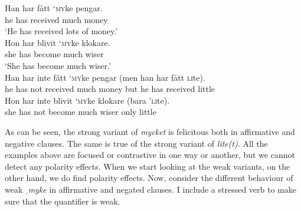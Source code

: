 \documentclass[output=paper]{langscibook}
\begin{document}
\ea
\gll Han    har    fått         ‘\textsc{my}ke   pengar.\\
he           has       received   much     money\\
\glt `He has received lots of money.’\\
\ex
\gll Hon  har   blivit     ‘\textsc{my}ke   klokare.\\
she         has    become  much    wiser\\
\glt `She has become much wiser.’\\
\ex
\gll Han  har     inte     fått       ‘\textsc{my}ke   pengar (men   han     har   fått \textsc{li}te).\\
he       has       not     received  much     money   but   he   has   received   little\\
\ex
\gll Hon    har     inte     blivit     ‘\textsc{my}ke     klokare   (bara     ’\textsc{li}te).\\
she             has       not     become     much   wiser     only     little\\
\z


As can be seen, the strong variant of \textit{mycket} is felicitous both in affirmative and negative clauses. The same is true of the strong variant of \textit{lite(t)}. All the examples above are focused or contrastive in one way or another, but we cannot detect any polarity effects. When we start looking at the weak variants, on the other hand, we do find polarity effects. Now, consider the different behaviour of weak \textit{ˌmyke} in affirmative and negated clauses. I include a stressed verb to make sure that the quantifier is weak.

{\judgewidth{\#}
\z}
\end{document}
